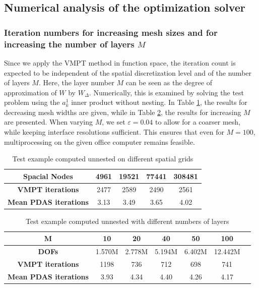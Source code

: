 \documentclass[a4paper,11pt]{article}
\theoremstyle{remark}
\begin{document}
\subsection{Numerical analysis of the optimization solver}
\label{sec:SolverSpec}


\subsubsection{\texorpdfstring{Iteration numbers for increasing mesh sizes and for increasing the number of layers $M$}{Iteration numbers for increasing mesh sizes and number of layers M}}
Since we apply the VMPT method in function space, the iteration count is expected to be independent of the spatial discretization level and of the number of layers $M$.
Here, the layer number $M$ can be seen as the degree of approximation of $W$ by $W_{\Delta}$.
Numerically, this  is examined by solving the test problem using the $a_k^1$ inner product without nesting.
In Table \ref{tab:MeshDependence}, the results for decreasing mesh widths are given, while in Table \ref{tab:MDependence}, the results for increasing $M$ are presented.
When varying $M$, we set $\varepsilon=0.04$ to allow for a coarser mesh, while keeping interface resolutions sufficient. This ensures that even for $M=100$, multiprocessing on the given office computer remains feasible.

\begin{table}[th!]
\centering
\begin{tabular}{|c|c|c|c|c|}
\hline
\textbf{Spacial Nodes} & 4961 & 19521 & 77441 & 308481 \\
\hline
\hline
\textbf{VMPT iterations} & 2477 & 2589 & 2490 & 2561 \\
\hline
\textbf{Mean PDAS iterations} & 3.13 & 3.49 & 3.65 & 4.02 \\
\hline
\end{tabular}
\caption{Test example computed unnested on different spatial grids}
\label{tab:MeshDependence}
\end{table}

\begin{table}[th!]
\centering
\begin{tabular}{|c|c|c|c|c|c|c|}
\hline
\textbf{M} & 10 & 20 & 40 & 50 & 100 \\
\hline
\hline
\textbf{DOFs} & 1.570M & 2.778M & 5.194M & 6.402M & 12.442M \\
\hline
\textbf{VMPT iterations} & 1198 & 736 & 712 & 698 & 741 \\
\hline
\textbf{Mean PDAS iterations} & 3.93 & 4.34 & 4.40 & 4.26 & 4.17 \\
\hline
\end{tabular}
\caption{Test example computed unnested with different numbers of layers}
\label{tab:MDependence}
\end{table}
\end{document}
